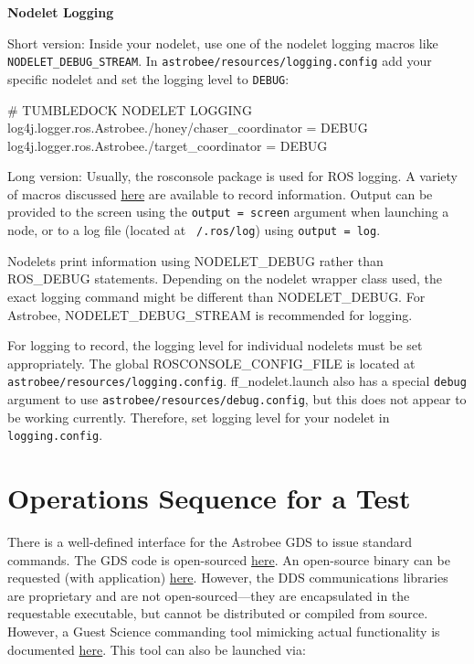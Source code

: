 \documentclass{article}
\begin{document}
\textbf{Nodelet Logging}

Short version: Inside your nodelet, use one of the nodelet logging macros like \texttt{NODELET\_DEBUG\_STREAM}. In \texttt{astrobee/resources/logging.config} add your specific nodelet and set the logging level to \texttt{DEBUG}:\begin{markdown}
	# TUMBLEDOCK NODELET LOGGING
	log4j.logger.ros.Astrobee./honey/chaser_coordinator    = DEBUG
	log4j.logger.ros.Astrobee./target_coordinator          = DEBUG
\end{markdown}
\vspace{1cm}
Long version: Usually, the rosconsole package is used for ROS logging. A variety of macros discussed \href{http://wiki.ros.org/roscpp/Overview/Logging}{here} are available to record information. Output can be provided to the screen using the \texttt{output = screen} argument when launching a node, or to a log file (located at \texttt{~/.ros/log}) using \texttt{output = log}.

Nodelets print information using NODELET\_DEBUG rather than ROS\_DEBUG statements. Depending on the nodelet wrapper class used, the exact logging command might be different than NODELET\_DEBUG. For Astrobee, NODELET\_DEBUG\_STREAM is recommended for logging.

For logging to record, the logging level for individual nodelets must be set appropriately. The global ROSCONSOLE\_CONFIG\_FILE is located at \texttt{astrobee/resources/logging.config}. ff\_nodelet.launch also has a special \texttt{debug} argument to use \texttt{astrobee/resources/debug.config}, but this does not appear to be working currently. Therefore, set logging level for your nodelet in \texttt{logging.config}.


\section{Operations Sequence for a Test}

There is a well-defined interface for the Astrobee GDS to issue standard commands. The GDS code is open-sourced \href{https://github.com/nasa/astrobee_gds/}{here}. An open-source binary can be requested (with application) \href{https://software.nasa.gov/software/ARC-17994-1}{here}. However, the DDS communications libraries are proprietary and are not open-sourced---they are encapsulated in the requestable executable, but cannot be distributed or compiled from source. However, a Guest Science commanding tool mimicking actual functionality is documented \href{https://github.com/nasa/astrobee_android/blob/master/running_gs_app.md#4-guest-science-commanding}{here}. This tool can also be launched via:
\end{document}
